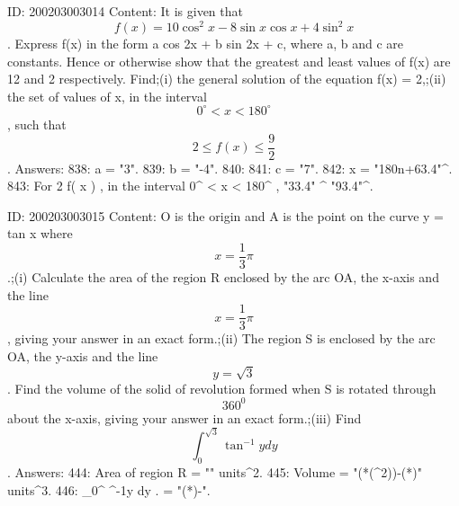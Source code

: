\documentclass{article}
\begin{document}
ID: 200203003014
Content:
It is given that  $$f( x ) = 10\cos ^2 x - 8\sin x\cos x + 4\sin ^2 x$$. Express f(x) in the form a cos 2x + b sin 2x + c, where a, b and c are constants. Hence or otherwise show that the greatest and least values of f(x) are 12 and 2 respectively. Find;(i) the general solution of the equation f(x) = 2,;(ii) the set of values of x, in the interval  $$0^{\circ}  < x < 180^{\circ} $$, such that  $$2 \le f( x ) \le \frac{9}{2}$$. Answers:
838: a = "3".
839: b = "-4".
840: 
841: c = "7".
842: x = "180n+63.4"^{\circ}.
843: For 2 \le f( x ) \le {}, in the interval 0^{\circ}  < x < 180^{\circ} , "33.4" ^{\circ} \leqx\leq"93.4"^{\circ}.

ID: 200203003015
Content:
O is the origin and A is the point on the curve y = tan x where  $$x = \frac{1}{3}\pi $$.;(i) Calculate the area of the region R enclosed by the arc OA, the x-axis and the line  $$x = \frac{1}{3}\pi $$, giving your answer in an exact form.;(ii) The region S is enclosed by the arc OA, the y-axis and the line  $$y = \sqrt 3 $$. Find the volume of the solid of revolution formed when S is rotated through  $$360^0 $$ about the x-axis, giving your answer in an exact form.;(iii) Find  $$\int_0^{\sqrt 3} \tan ^{-1} y dy $$. Answers:
444: Area of region R = "" units^2.
445: Volume = "(*(\pi^2))-(*\pi)" units^3.
446: \int_0^{} \tan^{-1}{y} \space dy . = "(*\pi)-".
\end{document}
